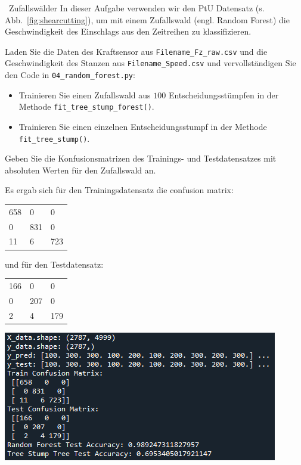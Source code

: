 \begin{task}[credit=4]{\codesym~Zufallswälder}
In dieser Aufgabe verwenden wir den PtU Datensatz (s. Abb.~\ref{fig:shearcutting}), um mit einem Zufallswald (engl. Random Forest) die Geschwindigkeit des Einschlags aus den Zeitreihen zu klassifizieren.
 
\begin{subtask}[points=2,title=\codesym~\texttt{04\_random\_forest.py}]
Laden Sie die Daten des Kraftsensor aus \texttt{Filename\_Fz\_raw.csv} und die Geschwindigkeit des Stanzen aus \texttt{Filename\_Speed.csv} und vervollständigen Sie den Code in \texttt{04\_random\_forest.py}:

\begin{itemize}
\item[\codesym] Trainieren Sie einen Zufallswald aus $100$ Entscheidungsstümpfen in der Methode \texttt{fit\_tree\_stump\_forest()}.

\item[\codesym] Trainieren Sie einen einzelnen Entscheidungsstumpf in der Methode \texttt{fit\_tree\_stump()}.
\end{itemize}
\end{subtask}

\begin{subtask}[title=Konfusionsmatrix,points=2]
Geben Sie die Konfusionsmatrizen des Trainings- und Testdatensatzes mit absoluten Werten für den Zufallswald  an.

\begin{solution}
	Es ergab sich für den Trainingsdatensatz die confusion matrix:
		\begin{table}[H]
			\begin{tabular}{lll}
				658 & 0   & 0   \\
				0   & 831 & 0   \\
				11  & 6   & 723
			\end{tabular}
		\end{table}
	und für den Testdatensatz:
		\begin{table}[H]
			\begin{tabular}{lll}
				166 & 0   & 0   \\
				0   & 207 & 0   \\
				2   & 4   & 179
			\end{tabular}
		\end{table}
\includegraphics[width=\linewidth]{ue4ergebnisse.png}
\end{solution}

\end{subtask}

\end{task}
